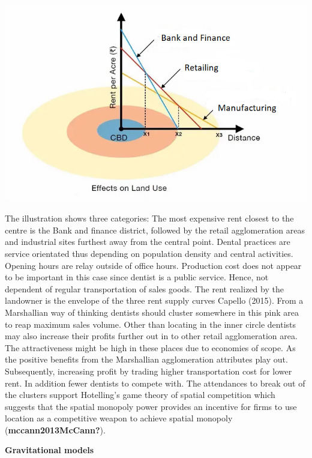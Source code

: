 \documentclass[
  10,
  a4paper,
]{article}
\begin{document}
\includegraphics{images/bidrent.png}

The illustration shows three categories: The most expensive rent closest
to the centre is the Bank and finance district, followed by the retail
agglomeration areas and industrial sites furthest away from the central
point. Dental practices are service orientated thus depending on
population density and central activities. Opening hours are relay
outside of office hours. Production cost does not appear to be important
in this case since dentist is a public service. Hence, not dependent of
regular transportation of sales goods. The rent realized by the
landowner is the envelope of the three rent supply curves Capello
(2015). From a Marshallian way of thinking dentists should cluster
somewhere in this pink area to reap maximum sales volume. Other than
locating in the inner circle dentists may also increase their profits
further out in to other retail agglomeration area. The attractiveness
might be high in these places due to economies of scope. As the positive
benefits from the Marshallian agglomeration attributes play out.
Subsequently, increasing profit by trading higher transportation cost
for lower rent. In addition fewer dentists to compete with. The
attendances to break out of the clusters support Hotelling's game theory
of spatial competition which suggests that the spatial monopoly power
provides an incentive for firms to use location as a competitive weapon
to achieve spatial monopoly (\textbf{mccann2013McCann?}).

\textbf{Gravitational models}
\end{document}
